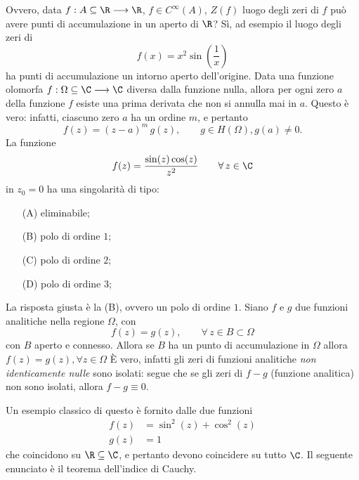     Ovvero, data $ f: A \subseteq \R \longrightarrow \R $, $ f \in C^{ \infty}(A) $, $ Z(f) $ luogo degli zeri di $ f $ può avere punti di accumulazione in un aperto di $ \R $?
    Sì, ad esempio il luogo degli zeri di \[
        f(x)= x^{2}\sin \left(\frac{1}{x}\right)
    \]ha punti di accumulazione un intorno aperto dell'origine.
    Data una funzione olomorfa $f:\Omega \subseteq \C\longrightarrow\C$ diversa dalla funzione nulla, allora per ogni zero $a$ della funzione $f$ esiste una prima derivata che non si annulla mai in $a$.
    Questo è vero: infatti, ciascuno zero $ a $ ha un ordine $ m $, e pertanto \[
        f(z) = (z-a)^{m}\, g(z),\qquad g \in H(\Omega), g(a)\neq 0.
    \]
    La funzione \[f(z)=\frac{\sin(z)\cos(z)}{z^2}\qquad \forall\, z\in\C\]in $z_0=0$ ha una singolarità di tipo:
    \begin{itemize}
        \item[(A)] eliminabile;
        \item[(B)] polo di ordine $ 1 $; 
        \item[(C)] polo di ordine $ 2 $;
        \item[(D)] polo di ordine $ 3 $;
    \end{itemize}
    La risposta giusta è la (B), ovvero un polo di ordine $ 1 $.
Siano $f$ e $g$ due funzioni analitiche nella regione $\Omega$, con \[f(z)=g(z),\qquad \forall \, z\in B \subset\Omega\]con $ B$ aperto e connesso. Allora se $B$ ha un punto di accumulazione in $\Omega$ allora $f(z)=g(z),  \forall z\in\Omega$
    È vero, infatti gli zeri di funzioni analitiche \emph{non identicamente nulle} sono isolati: segue che se gli zeri di $ f-g $ (funzione analitica) non sono isolati, allora $ f-g \equiv 0$. 

    Un esempio classico di questo è fornito dalle due funzioni \begin{align*}
        f(z) &= \sin^{2}(z) + \cos^{2}(z)\\ 
        g(z) &= 1
    \end{align*}che coincidono su $ \R \subseteq \C$, e pertanto devono coincidere su tutto $ \C $.
    Il seguente enunciato è il teorema dell'indice di Cauchy.


